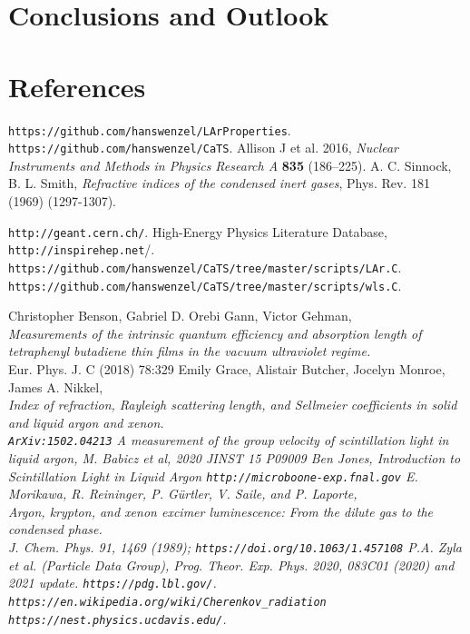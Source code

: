 \documentclass{article}
\begin{document}
\section{Conclusions and Outlook}
\clearpage
 \section*{References}

 \begin{thebibliography}{99}
   \verb|https://github.com/hanswenzel/LArProperties|.
   \verb|https://github.com/hanswenzel/CaTS|.
 Allison J et al. 2016, {\it Nuclear Instruments and Methods in Physics
   Research A} {\bf 835} (186--225).
 A. C. Sinnock, B. L. Smith, {\it Refractive indices of the condensed inert gases}, Phys. Rev. 181 (1969) (1297-1307).
 
 \verb|http://geant.cern.ch/|.
 High-Energy Physics Literature Database,
  \verb"http://inspirehep.net"/.
  \verb|https://github.com/hanswenzel/CaTS/tree/master/scripts/LAr.C|.\\
  \verb|https://github.com/hanswenzel/CaTS/tree/master/scripts/wls.C|.

 Christopher Benson, Gabriel D. Orebi Gann, Victor Gehman,\\
  {\it Measurements of the intrinsic quantum efficiency and absorption
      length of tetraphenyl butadiene thin films in the vacuum
      ultraviolet regime.}\\
Eur. Phys. J. C (2018) 78:329
Emily Grace, Alistair Butcher, Jocelyn Monroe, James A. Nikkel,\\
  \it{Index of refraction, Rayleigh scattering length, and Sellmeier coefficients in solid and liquid argon and xenon.}\\
  \verb|ArXiv:1502.04213|
  \it{A measurement of the group velocity of scintillation light in liquid argon},
  M. Babicz et al, 2020 JINST 15 P09009
  Ben Jones, \it{Introduction to Scintillation Light in Liquid Argon}
  \verb|http://microboone-exp.fnal.gov|
  E. Morikawa, R. Reininger, P. Gürtler, V. Saile, and P. Laporte,\\
\it{Argon, krypton, and xenon excimer luminescence: From the dilute gas to the
condensed phase.}\\
J. Chem. Phys. 91, 1469 (1989);
  \verb|https://doi.org/10.1063/1.457108|
P.A. Zyla et al. (Particle Data Group), Prog. Theor. Exp. Phys. 2020, 083C01 (2020) and 2021 update.
\verb|https://pdg.lbl.gov/|.
  \verb|https://en.wikipedia.org/wiki/Cherenkov_radiation|
  \verb|https://nest.physics.ucdavis.edu/|.
\end{thebibliography}
\end{document}
